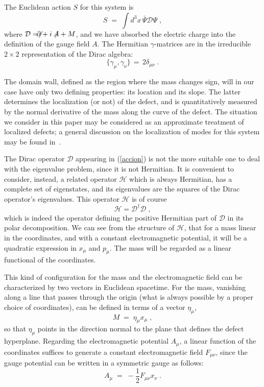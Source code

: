 \documentclass[a4paper,12pt]{article}
\newcommand{\n}{\eta}
\begin{document}
The Euclidean action $S$ for this system is
\begin{equation}\label{accion}
S\;=\; \int d^3x \,\bar{\Psi} {\mathcal D} \Psi \;,
\end{equation}
where ${\mathcal D}=\not\!\!\!\partial+i\not\!\!A+M$, and we have absorbed
the electric charge into the definition of the gauge field $A$. The
Hermitian $\gamma$-matrices are in the irreducible $2\times 2$ representation of
the Dirac algebra:
\begin{equation}\label{gammas}
\{\gamma_{\mu},\gamma_{\nu}\}\,=\,2\delta_{\mu\nu} \;.
\end{equation}

The domain wall, defined as the region where the mass changes sign,
will in our case have only two defining properties: its location and
its slope.  The latter determines the localization (or not) of the
defect, and is quantitatively measured by the normal derivative of the
mass along the curve of the defect. The situation we consider in this
paper may be considered as an approximate treatment of localized
defects; a general discussion on the localization of modes for this
system may be found in~\cite{paper2+1}.


The Dirac operator ${\mathcal D}$ appearing in (\ref{accion}) is not
the more suitable one to deal with the eigenvalue problem, since it is
not Hermitian.  It is convenient to consider, instead, a related
operator ${\mathcal H}$ which is always Hermitian, has a complete set
of eigenstates, and its eigenvalues are the squares of the Dirac
operator's eigenvalues.  This operator ${\mathcal H}$ is of course
\begin{equation}\label{hermitico}
{\mathcal H}={\mathcal D}^\dagger {\mathcal D}\;,
\end{equation}
which is indeed the operator defining the positive Hermitian part of
${\mathcal D}$ in its polar decomposition.  We can see from the
structure of ${\mathcal H}$, that for a mass linear in the
coordinates, and with a constant electromagnetic potential, it will be
a quadratic expression in $x_\mu$ and $p_\mu$.  The mass will be regarded
as a linear functional of the coordinates.

This kind of configuration for the mass and the electromagnetic field
can be characterized by two vectors in Euclidean spacetime. For the
mass, vanishing along a line that passes through the origin (what is
always possible by a proper choice of coordinates), can be defined in
terms of a vector $\n_\mu$,
\begin{equation}\label{M}
M\;=\;\n_\mu x_\mu \;,
\end{equation}
so that $\n_\mu$ points in the direction normal to the plane that
defines the defect hyperplane.  Regarding the electromagnetic
potential $A_\mu$, a linear function of the coordinates suffices to
generate a constant electromagnetic field $F_{\mu\nu}$, since the gauge
potential can be written in a symmetric gauge as follows:
\begin{equation}\label{A}
A_\mu\;=\;-\frac{1}{2}F_{\mu\nu}x_\nu \;.
\end{equation}
\end{document}
